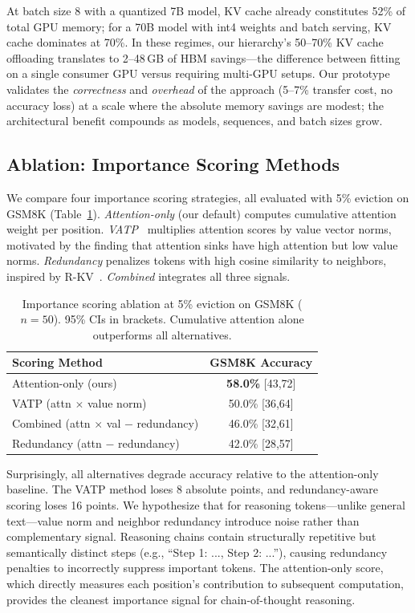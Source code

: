 \documentclass{article}
\begin{document}
At batch size 8 with a quantized 7B model, KV cache already constitutes 52\% of total GPU memory; for a 70B model with int4 weights and batch serving, KV cache dominates at 70\%.
In these regimes, our hierarchy's 50--70\% KV cache offloading translates to 2--48\,GB of HBM savings---the difference between fitting on a single consumer GPU versus requiring multi-GPU setups.
Our prototype validates the \emph{correctness} and \emph{overhead} of the approach (5--7\% transfer cost, no accuracy loss) at a scale where the absolute memory savings are modest; the architectural benefit compounds as models, sequences, and batch sizes grow.

\subsection{Ablation: Importance Scoring Methods}
\label{sec:scoring_ablation}

We compare four importance scoring strategies, all evaluated with 5\% eviction on GSM8K (Table~\ref{tab:scoring}).
\emph{Attention-only} (our default) computes cumulative attention weight per position.
\emph{VATP}~\cite{vatp} multiplies attention scores by value vector norms, motivated by the finding that attention sinks have high attention but low value norms.
\emph{Redundancy} penalizes tokens with high cosine similarity to neighbors, inspired by R-KV~\cite{rkv}.
\emph{Combined} integrates all three signals.

\begin{table}[t]
\centering
\caption{Importance scoring ablation at 5\% eviction on GSM8K ($n=50$). 95\% CIs in brackets.
Cumulative attention alone outperforms all alternatives.}
\label{tab:scoring}
\vskip 0.1in
\begin{tabular}{lc}
\toprule
\textbf{Scoring Method} & \textbf{GSM8K Accuracy} \\
\midrule
Attention-only (ours) & \textbf{58.0\%} {\scriptsize[43,72]} \\
VATP (attn $\times$ value norm) & 50.0\% {\scriptsize[36,64]} \\
Combined (attn $\times$ val $-$ redundancy) & 46.0\% {\scriptsize[32,61]} \\
Redundancy (attn $-$ redundancy) & 42.0\% {\scriptsize[28,57]} \\
\bottomrule
\end{tabular}
\end{table}

Surprisingly, all alternatives degrade accuracy relative to the attention-only baseline.
The VATP method loses 8 absolute points, and redundancy-aware scoring loses 16 points.
We hypothesize that for reasoning tokens---unlike general text---value norm and neighbor redundancy introduce noise rather than complementary signal.
Reasoning chains contain structurally repetitive but semantically distinct steps (e.g., ``Step 1: ..., Step 2: ...''), causing redundancy penalties to incorrectly suppress important tokens.
The attention-only score, which directly measures each position's contribution to subsequent computation, provides the cleanest importance signal for chain-of-thought reasoning.
\end{document}
